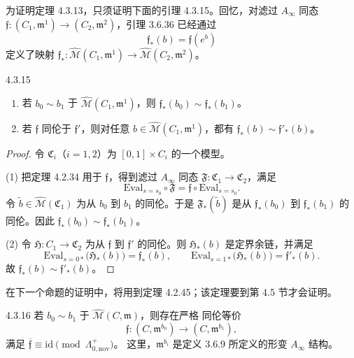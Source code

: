 为证明定理 4.3.13，只须证明下面的引理 4.3.15。回忆，对滤过
$A_\infty$ 同态
$\mathfrak f\colon(C_1,\mathfrak m^1)\to(C_2,\mathfrak m^2)$，引理
3.6.36 已经通过
\[
 \mathfrak f_*(b)=\mathfrak f(e^b)
\]
定义了映射
$\mathfrak f_*\colon\widehat{\mathcal M}(C_1,\mathfrak m^1)
\to\widehat{\mathcal M}(C_2,\mathfrak m^2)$。

\pagebreak[3]
\begin{lemma}{4.3.15}\label{lem:4-3-15}
\begin{enumerate}[label=\textup{(\arabic*)},leftmargin=2.8em]
 \item 若 $b_0\sim b_1$ 于
 $\widehat{\mathcal M}(C_1,\mathfrak m^1)$，则
 $\mathfrak f_*(b_0)\sim\mathfrak f_*(b_1)$。
 \item 若 $\mathfrak f$ 同伦于 $\mathfrak f'$，则对任意
 $b\in\widehat{\mathcal M}(C_1,\mathfrak m^1)$，都有
 $\mathfrak f_*(b)\sim\mathfrak f'_*(b)$。
\end{enumerate}
\end{lemma}

\begin{proof}
令 $\mathfrak C_i$（$i=1,2$）为 $[0,1]\times C_i$ 的一个模型。

(1) 把定理 4.2.34 用于 $\mathfrak f$，得到滤过 $A_\infty$ 同态
$\mathfrak F\colon\mathfrak C_1\to\mathfrak C_2$，满足
\[
 \mathrm{Eval}_{s=s_0}\circ\mathfrak F
 =\mathfrak f\circ\mathrm{Eval}_{s=s_0}.
\]
令 $\widetilde b\in\widehat{\mathcal M}(\mathfrak C_1)$ 为从 $b_0$
到 $b_1$ 的同伦。于是 $\mathfrak F_*(\widetilde b)$ 是从
$\mathfrak f_*(b_0)$ 到 $\mathfrak f_*(b_1)$ 的同伦。因此
$\mathfrak f_*(b_0)\sim\mathfrak f_*(b_1)$。

(2) 令 $\mathfrak H\colon C_1\to\mathfrak C_2$ 为从 $\mathfrak f$
到 $\mathfrak f'$ 的同伦。则 $\mathfrak H_*(b)$ 是定界余链，并满足
\[
 \mathrm{Eval}_{s=0*}\bigl(\mathfrak H_*(b)\bigr)=\mathfrak f_*(b),
 \qquad
 \mathrm{Eval}_{s=1*}\bigl(\mathfrak H_*(b)\bigr)=\mathfrak f'_*(b).
\]
故 $\mathfrak f_*(b)\sim\mathfrak f'_*(b)$。
\end{proof}

在下一个命题的证明中，将用到定理 4.2.45；该定理要到第 4.5 节才会证明。

\begin{proposition}{4.3.16}\label{prop:4-3-16}
若 $b_0\sim b_1$ 于 $\widehat{\mathcal M}(C,\mathfrak m)$，则存在严格
同伦等价
\[
 \mathfrak f\colon(C,\mathfrak m^{b_0})
 \longrightarrow(C,\mathfrak m^{b_1}),
\]
满足
$\overline{\mathfrak f}\equiv\mathrm{id}\pmod{\Lambda^+_{0,\mathrm{nov}}}$。
这里，$\mathfrak m^{b_i}$ 是定义 3.6.9 所定义的形变
$A_\infty$ 结构。
\end{proposition}

